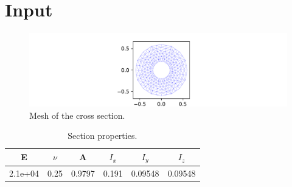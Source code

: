 \documentclass{article}%
\begin{document}
%
\newpage

%
\section{Input}%
\label{sec:Input}%


\begin{figure}[h!]%
\centering%
\includegraphics[width=\textwidth]{cross section.pdf}%
\caption{Mesh of the cross section.}%
\end{figure}

%
\begin{table}[h!]\centering%
\begin{tabular}{| c c | c c c c |}%
\hline%
E&$\nu$&A&$I_x$&$I_y$&$I_z$\\%
\hline%
\hline%
2.1e+04&0.25&0.9797&0.191&0.09548&0.09548\\%
\hline%
\end{tabular}%
\caption{Section properties.}\label{table:tbl-section}\end{table}

%
\end{document}
